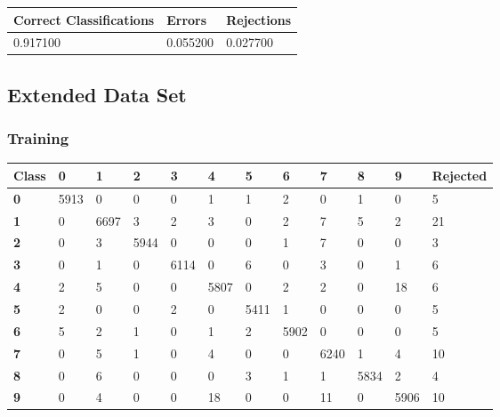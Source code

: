 \documentclass[
  a4paper,            %
  DIV=10,             %
  oneside,            %
  BCOR=5mm,           %
  parskip=half,       %
  numbers=noenddot,   %
  bibtotoc,           %
  listof=totoc,        %
  article
]{scrreprt}
\begin{document}
\begin{center}
  \begin{tabular}{|p{5cm}|p{3cm}|p{3cm}|}
    \hline
    \textbf{Correct Classifications} & \textbf{Errors} & \textbf{Rejections} \\
    \hline
    0.917100 & 0.055200 & 0.027700 \\
    \hline
  \end{tabular}
\end{center}
\subsection{Extended Data Set}
\subsubsection{Training}
\begin{center}
  \begin{tabular}{|p{1cm}|p{1cm}|p{1cm}|p{1cm}|p{1cm}|p{1cm}|p{1cm}|p{1cm}|p{1cm}|p{1cm}|p{1cm}|p{1.7cm}|}
    \hline
    \textbf{Class} & \textbf{0} & \textbf{1} & \textbf{2} & \textbf{3} & \textbf{4} & \textbf{5} & \textbf{6} & \textbf{7} & \textbf{8} & \textbf{9} & \textbf{Rejected} \\
    \hline
    \textbf{0} & 5913 & 0 & 0 & 0 & 1 & 1 & 2 & 0 & 1 & 0 & 5 \\
    \hline
    \textbf{1} & 0 & 6697 & 3 & 2 & 3 & 0 & 2 & 7 & 5 & 2 & 21 \\
    \hline
    \textbf{2} & 0 & 3 & 5944 & 0 & 0 & 0 & 1 & 7 & 0 & 0 & 3 \\
    \hline
    \textbf{3} & 0 & 1 & 0 & 6114 & 0 & 6 & 0 & 3 & 0 & 1 & 6 \\
    \hline
    \textbf{4} & 2 & 5 & 0 & 0 & 5807 & 0 & 2 & 2 & 0 & 18 & 6 \\
    \hline
    \textbf{5} & 2 & 0 & 0 & 2 & 0 & 5411 & 1 & 0 & 0 & 0 & 5 \\
    \hline
    \textbf{6} & 5 & 2 & 1 & 0 & 1 & 2 & 5902 & 0 & 0 & 0 & 5 \\
    \hline
    \textbf{7} & 0 & 5 & 1 & 0 & 4 & 0 & 0 & 6240 & 1 & 4 & 10 \\
    \hline
    \textbf{8} & 0 & 6 & 0 & 0 & 0 & 3 & 1 & 1 & 5834 & 2 & 4 \\
    \hline
    \textbf{9} & 0 & 4 & 0 & 0 & 18 & 0 & 0 & 11 & 0 & 5906 & 10 \\
    \hline
  \end{tabular}
\end{center}
\end{document}
